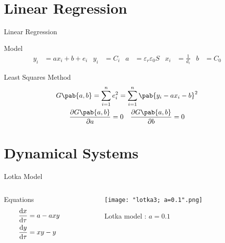 \documentclass[xcolor]{beamer}
\newcommand{\inv}[1]{\frac{1}{#1}}
\begin{document}
\section{Linear Regression}
\begin{frame}{Linear Regression}
\begin{block}{Model}
\begin{align*}
y_{i} &= a x_{i} + b + e_{i} & y_{i} &= C_{i} & a &= \varepsilon_{r}\varepsilon_{0}S & x_{i} &= \inv{d_{i}} & b &= C_{0}
\end{align*}
\end{block}
\begin{block}{Least Squares Method}
\begin{gather*}
G\pab{a,b} = \sum_{i=1}^{n}e_{i}^{2} = \sum_{i=1}^{n}\pab{y_{i} - a x_{i} - b}^{2} \\
\pdv{G\pab{a,b}}{a} = 0 \quad \pdv{G\pab{a,b}}{b} = 0
\end{gather*}
\end{block}
\end{frame}

\section{Dynamical Systems}
\begin{frame}{Lotka Model}
\begin{columns}
\begin{column}{0.4\textwidth}
\begin{block}{Equations}
\begin{align*}
\odv{x}{\tau} &= a - axy \\
\odv{y}{\tau} &= xy - y
\end{align*}
\end{block}
\end{column}

\begin{column}{0.6\textwidth}
\begin{figure}[H]
\centering
\texttt{[image: "lotka3; a=0.1".png]}
\caption{Lotka model  : \(a=0.1\)}
\end{figure}
\end{column}
\end{columns}
\end{frame}
\end{document}
